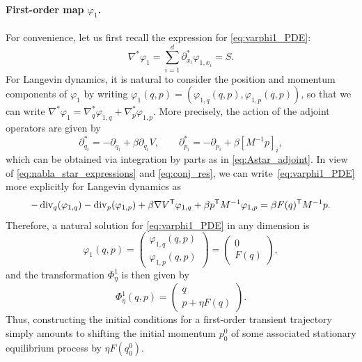 \paragraph{First-order map $\varphi_1$.} For convenience, let us first recall the expression for \eqref{eq:varphi1_PDE}: %
%
\begin{equation}
	\nabla^*\varphi_1 = \sum_{i=1}^d \partial_{x_i}^* \varphi_{1,x_i} = S. %
\end{equation}
%
For Langevin dynamics, it is natural to consider the position and momentum components of $\varphi_1$ by writing $\varphi_1(q,p) = (\varphi_{1,q}(q,p), \varphi_{1,p}(q,p))$, so that we can write $\nabla^*\varphi_1 = \nabla^*_q\varphi_{1,q} + \nabla^*_p\varphi_{1,p}$. More precisely, the action of the adjoint operators are given by
%
\begin{equation}
	\partial^*_{q_i} = - \partial_{q_i} + \beta\partial_{q_i} V , \qquad \partial^*_{p_i} = - \partial_{p_i} + \beta \left[ M^{-1}p \right]_i,
	\label{eq:nabla_star_expressions}
\end{equation}
%
which can be obtained via integration by parts as in \eqref{eq:Astar_adjoint}. In view of \eqref{eq:nabla_star_expressions} and \eqref{eq:conj_res}, we can write~\eqref{eq:varphi1_PDE} more explicitly for Langevin dynamics as
%
\begin{equation}
	-\operatorname{div}_q(\varphi_{1,q}) - \operatorname{div}_p(\varphi_{1,p}) + \beta \nabla V^\mathsf T \varphi_{1,q} + \beta p^\mathsf T M^{-1} \varphi_{1,p} = \beta F(q)^\mathsf T M^{-1} p.
\end{equation}
%
Therefore, a natural solution for \eqref{eq:varphi1_PDE} in any dimension is
%
\begin{equation}
	\varphi_1(q,p) = \begin{pmatrix}
 	\varphi_{1,q}(q,p) \\ \varphi_{1,p}(q,p)
 	\end{pmatrix} =
	\begin{pmatrix}
 	0 \\ F(q)
 	\end{pmatrix},
 	\label{eq:varphi1_sol}
\end{equation}
%
and the transformation $\Phi^1_\eta$ is then given by
%
\begin{equation}
	\Phi_\eta^1(q,p) = 
	\begin{pmatrix}
 	  q \\ p + \eta F(q)
 	\end{pmatrix}.
\end{equation}
%
Thus, constructing the initial conditions for a first-order transient trajectory simply amounts to shifting the initial momentum $p_0^0$ of some associated stationary equilibrium process by $\eta F(q_0^0)$.

